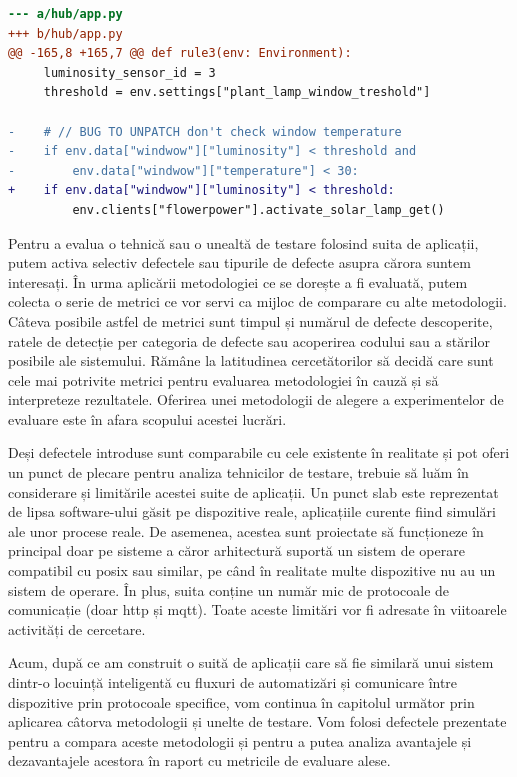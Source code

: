\begin{lstlisting}[language=diff, caption={Lipsa verificării temperaturii cauzează un conflict între două fluxuri de automatizare}]
--- a/hub/app.py
+++ b/hub/app.py
@@ -165,8 +165,7 @@ def rule3(env: Environment):
     luminosity_sensor_id = 3
     threshold = env.settings["plant_lamp_window_treshold"]
 
-    # // BUG TO UNPATCH don't check window temperature
-    if env.data["windwow"]["luminosity"] < threshold and 
-        env.data["windwow"]["temperature"] < 30:
+    if env.data["windwow"]["luminosity"] < threshold:
         env.clients["flowerpower"].activate_solar_lamp_get()
\end{lstlisting}

Pentru a evalua o tehnică sau o unealtă de testare folosind suita de aplicații, putem activa selectiv defectele sau tipurile de defecte asupra cărora suntem interesați. În urma aplicării metodologiei ce se dorește a fi evaluată, putem colecta o serie de metrici ce vor servi ca mijloc de comparare cu alte metodologii. Câteva posibile astfel de metrici sunt timpul și numărul de defecte descoperite, ratele de detecție per categoria de defecte sau acoperirea codului sau a stărilor posibile ale sistemului. Rămâne la latitudinea cercetătorilor să decidă care sunt cele mai potrivite metrici pentru evaluarea metodologiei în cauză și să interpreteze rezultatele. Oferirea unei metodologii de alegere a experimentelor de evaluare este în afara scopului acestei lucrări.

Deși defectele introduse sunt comparabile cu cele existente în realitate și pot oferi un punct de plecare pentru analiza tehnicilor de testare, trebuie să luăm în considerare și limitările acestei suite de aplicații. Un punct slab este reprezentat de lipsa software-ului găsit pe dispozitive reale, aplicațiile curente fiind simulări ale unor procese reale. De asemenea, acestea sunt proiectate să funcționeze în principal doar pe sisteme a căror arhitectură suportă un sistem de operare compatibil cu \acrfull{posix} sau similar, pe când în realitate multe dispozitive nu au un sistem de operare. În plus, suita conține un număr mic de protocoale de comunicație (doar \acrshort{http} și \acrshort{mqtt}). Toate aceste limitări vor fi adresate în viitoarele activități de cercetare.

Acum, după ce am construit o suită de aplicații care să fie similară unui sistem dintr-o locuință inteligentă cu fluxuri de automatizări și comunicare între dispozitive prin protocoale specifice, vom continua în capitolul următor prin aplicarea câtorva metodologii și unelte de testare. Vom folosi defectele prezentate pentru a compara aceste metodologii și pentru a putea analiza avantajele și dezavantajele acestora în raport cu metricile de evaluare alese.